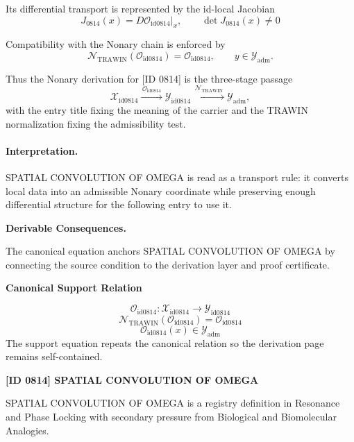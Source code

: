 Its differential transport is represented by the id-local Jacobian\[
J_{0814}(x)=D\mathcal{O}_{\mathrm{id0814}}\big|_x,\qquad \det J_{0814}(x)\neq 0
\]

Compatibility with the Nonary chain is enforced by\[
\mathcal{N}_{\mathrm{TRAWIN}}(\mathcal{O}_{\mathrm{id0814}})=\mathcal{O}_{\mathrm{id0814}},\qquad y\in\mathcal{Y}_{\mathrm{adm}}.
\]

Thus the Nonary derivation for [ID 0814] is the three-stage passage
\[
\mathcal{X}_{\mathrm{id0814}}\xrightarrow{\,\mathcal{O}_{\mathrm{id0814}}\,} \mathcal{Y}_{\mathrm{id0814}}\xrightarrow{\,\mathcal{N}_{\mathrm{TRAWIN}}\,} \mathcal{Y}_{\mathrm{adm}},
\]
with the entry title fixing the meaning of the carrier and the TRAWIN normalization fixing the admissibility test.

\paragraph{Interpretation.} SPATIAL CONVOLUTION OF OMEGA is read as a transport rule: it converts local data into an admissible Nonary coordinate while preserving enough differential structure for the following entry to use it.

\par\vspace{0.35em}
\noindent\textbf{Derivable Consequences.}\quad
\begingroup
\footnotesize
\raggedright
The canonical equation anchors SPATIAL CONVOLUTION OF OMEGA by connecting the source condition to the derivation layer and proof certificate.
\par\endgroup

\noindent\textbf{Canonical Support Relation}\par
\[
\mathcal{O}_{\mathrm{id0814}}:\mathcal{X}_{\mathrm{id0814}}\longrightarrow\mathcal{Y}_{\mathrm{id0814}}
\]
\[
\mathcal{N}_{\mathrm{TRAWIN}}(\mathcal{O}_{\mathrm{id0814}})=\mathcal{O}_{\mathrm{id0814}}
\]
\[
\mathcal{O}_{\mathrm{id0814}}(x)\in\mathcal{Y}_{\mathrm{adm}}
\]
\noindent The support equation repeats the canonical relation so the derivation page remains self-contained.\par

\clearpage
\noindent\textbf{[ID 0814] SPATIAL CONVOLUTION OF OMEGA}\par
\vspace{0.35em}
\begingroup\small
{}
SPATIAL CONVOLUTION OF OMEGA is a registry definition in Resonance and Phase Locking with secondary pressure from Biological and Biomolecular Analogies.

